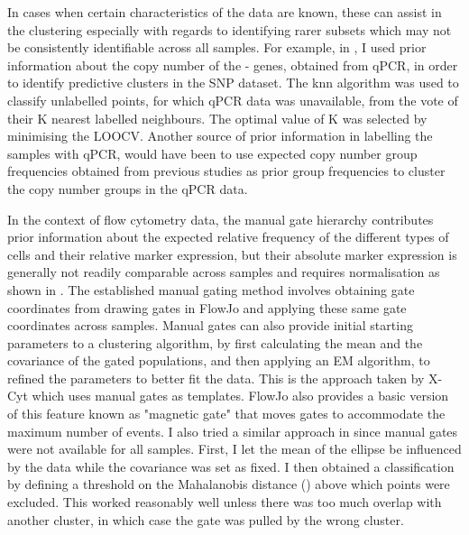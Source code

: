 In cases when certain characteristics of the data are known, these can assist in the clustering especially with regards to identifying rarer subsets which may not be consistently identifiable across all samples.
For example, in , I used prior information about the copy number of the - genes, obtained from qPCR, in order to identify predictive clusters in the SNP dataset.
The \gls{knn} algorithm was used to classify unlabelled points, for which qPCR data was unavailable, from the vote of their K nearest labelled neighbours.
The optimal value of K was selected by minimising the \gls{LOOCV}.
Another source of prior information in labelling the samples with qPCR, would have been to use expected copy number group frequencies obtained from previous studies \citep{Jiang:2012cf} as prior group frequencies to cluster the copy number groups in the qPCR data.

In the context of flow cytometry data, the manual gate hierarchy contributes prior information about the expected relative frequency of the different types of cells and their relative marker expression, but their absolute marker expression is generally not readily comparable across samples and requires normalisation as shown in .
The established manual gating method involves obtaining gate coordinates from drawing gates in FlowJo and applying these same
gate coordinates across samples.
Manual gates can also provide initial starting parameters to a clustering algorithm, by first calculating the mean and the covariance of the gated populations, and then applying an \gls{EM} algorithm, to refined the parameters to better fit the data.
This is the approach taken by X-Cyt \citep{Hu:2013bg} which uses manual gates as templates.
FlowJo also provides a basic version of this feature known as "magnetic gate" that moves gates to accommodate the maximum number of events.
I also tried a similar approach in  since manual gates were not available for all samples.
First, I let the mean of the ellipse be influenced by the data while the covariance was set as fixed.
I then obtained a classification by defining a threshold on the Mahalanobis distance () above which points were excluded.
This worked reasonably well unless there was too much overlap with another cluster, in which case the gate was pulled by the wrong cluster.

